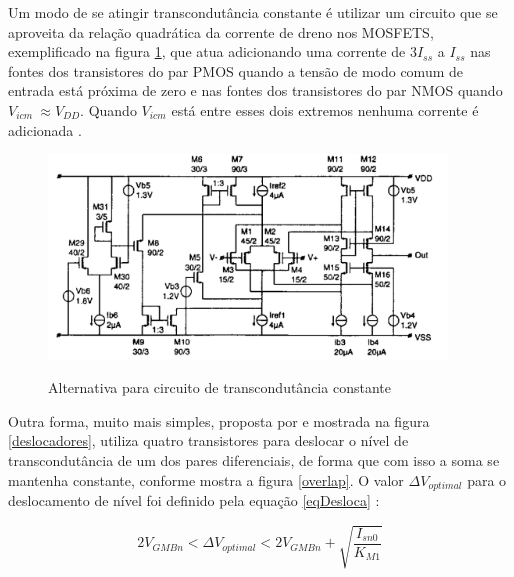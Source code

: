 \documentclass[
	12pt,				%
	oneside,			%
	a4paper,			%
	english,			%
	french,				%
	spanish,			%
	brazil				%
	]{abntex2}
\begin{document}
Um modo de se atingir transcondutância constante é utilizar um circuito que se aproveita da relação
quadrática da corrente de dreno nos MOSFETS, exemplificado na figura \ref{hogervorstCircuit}, que atua adicionando uma corrente de $3I_{ss}$ a $I_{ss}$ nas fontes dos transistores do par PMOS quando a tensão de modo comum de entrada está próxima de zero e nas fontes dos transistores do par NMOS quando \(V_{icm} ~ \approx V_{DD}\). Quando $V_{icm}$ está entre esses dois extremos nenhuma corrente é adicionada \cite{hogervorst}.

\begin{figure}[!ht]
  \centering
  \includegraphics[width=300pt]{hogervorstCircuit.PNG}\\
  \caption{Alternativa para circuito de transcondutância constante}\label{hogervorstCircuit}
\end{figure}

Outra forma, muito mais simples, proposta por  e mostrada na figura \ref{deslocadores}, utiliza quatro transistores para deslocar o nível de transcondutância de um dos pares diferenciais, de forma que com isso a soma se mantenha constante, conforme mostra a figura \ref{overlap}.
O valor \(\Delta V_{optimal}\) para o deslocamento de nível foi definido pela equação \ref{eqDesloca} \cite{Minsheng}:

\begin{equation}\label{eqDesloca}
2V_{GMBn} < \Delta V_{optimal} < 2V_{GMBn}+\sqrt{\frac{I_{sn0}}{K_{M1}}}
\end{equation}
\end{document}
